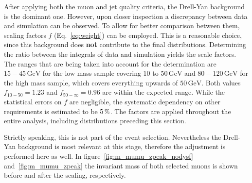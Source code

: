 After applying both the muon and jet quality criteria, the Drell-Yan background is the dominant one. However, upon closer inspection a discrepancy between data and simulation can be observed. To allow for better comparison between them, scaling factors $f$ (Eq.~\eqref{eq:weight}) can be employed. This is a reasonable choice, since this background does \textbf{not} contribute to the final distributions. Determining the ratio between the integrals of data and simulation yields the scale factors. The ranges that are being taken into account for the determination are $15 - 45\,\text{GeV}$ for the low mass sample covering $10$ to $50\,\text{GeV}$ and $80 - 120\,\text{GeV}$ for the high mass sample, which covers everything upwards of $50\,\text{GeV}$. Both values $f_{10-50} = 1.23$ and $f_{50-\infty} = 0.96$ are within the expected range. While the statistical errors on $f$ are negligible, the systematic dependency on other requirements is estimated to be $5\,\pct$. The factors are applied throughout the entire analysis, including distributions preceding this section.

Strictly speaking, this is not part of the event selection. Nevertheless the Drell-Yan background is most relevant at this stage, therefore the adjustment is performed here as well. In figure~\ref{fig:m_mumu_zpeak_nodysf} and~\ref{fig:m_mumu_zpeak} the invariant mass of both selected muons is shown before and after the scaling, respectively.

